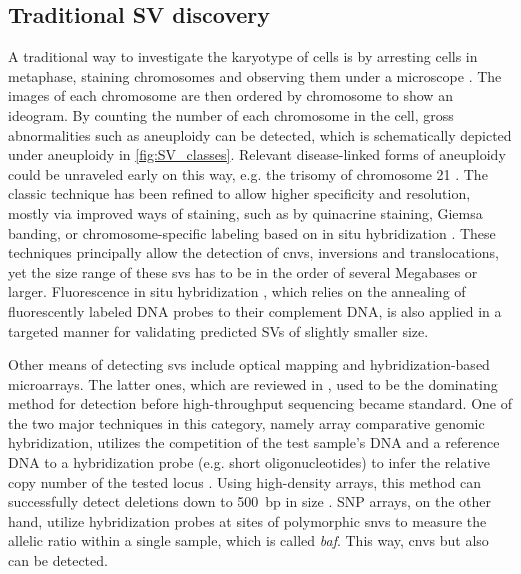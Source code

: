 \subsection{Traditional SV discovery}
\label{sec:sv_detection_old}

A traditional way to investigate the karyotype of cells is by arresting cells in
metaphase, staining chromosomes and observing them under a microscope
\citep{Speicher2005}. The images of each chromosome are then ordered by
chromosome to show an ideogram. By counting the number of each chromosome in the
cell, gross abnormalities such as aneuploidy can be detected, which is
schematically depicted under aneuploidy in \cref{fig:SV_classes}. Relevant
disease-linked forms of aneuploidy could be unraveled early on this way, e.g.
the trisomy of chromosome 21 \citep{Lejeune1959}. The classic technique has been
refined to allow higher specificity and resolution, mostly via improved ways of
staining, such as by quinacrine staining, Giemsa banding, or chromosome-specific
labeling based on in situ hybridization \citep{Speicher2005}. These techniques
principally allow the detection of \acp{cnv}, inversions and translocations,
yet the size range of these \acp{sv} has to be in the order of several Megabases
or larger. Fluorescence in situ hybridization \citep{Bauman1980}, which relies
on the annealing of fluorescently labeled DNA probes to their complement DNA,
is also applied in a targeted manner for validating predicted SVs of slightly
smaller size.

Other means of detecting \acp{sv} include optical mapping
\citep{Schwartz1993,Teague2010} and hybridization-based microarrays. The latter
ones, which are reviewed in \cite{Alkan2011}, used to be the dominating method
for \cnv detection before high-throughput sequencing became standard. One of the
two major techniques in this category, namely array comparative genomic
hybridization, utilizes the competition of the test sample's DNA and a reference
DNA to a hybridization probe (e.g. short oligonucleotides) to infer the relative
copy number of the tested locus \citep{Snijders2001}. Using high-density arrays,
this method can successfully detect deletions down to 500~bp in size
\citep{Conrad2010}. SNP arrays, on the other hand, utilize hybridization probes
at sites of polymorphic \acp{snv} to measure the allelic ratio within a single
sample, which is called \emph{\acf{baf}}. This way, \acp{cnv} but also \loh can
be detected.





